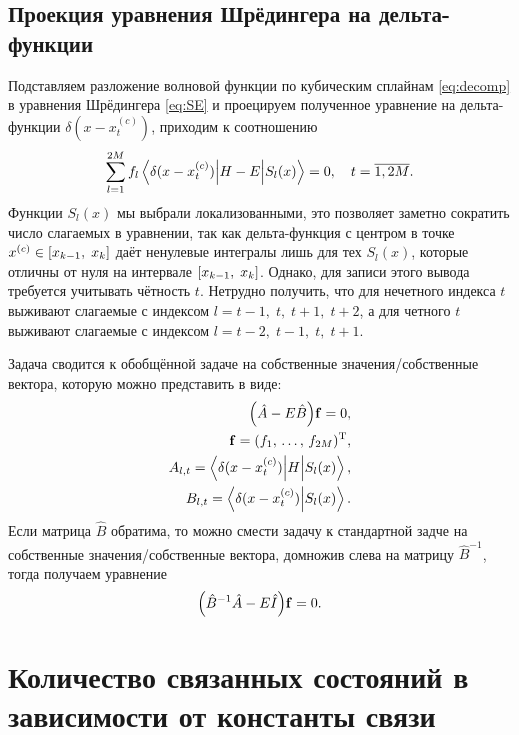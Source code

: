 \documentclass[10pt]{article}
\begin{document}
\subsection{Проекция уравнения Шрёдингера на дельта-функции}

Подставляем разложение волновой функции по кубическим сплайнам \eqref{eq:decomp} в уравнения Шрёдингера \eqref{eq:SE} и проецируем полученное уравнение на дельта-функции $\delta(x-x^{(c)}_t)$, приходим к соотношению
\begin{equation}
    \sum\limits_{l=1}^{2M} f_{l}
    \mel**{\delta(x-x^{(c)}_t)}{H-E}{S_{l}(x)}=0,\quad t=\overline{1,2M}.
\end{equation}
Функции $S_l(x)$ мы выбрали локализованными, это позволяет заметно сократить число слагаемых в уравнении, так как дельта-функция с центром в точке $x^{(c)}\in\qty[x_{k-1},\;x_{k}]$ даёт ненулевые интегралы лишь для тех $S_l(x)$, которые отличны от нуля на интервале $\qty[x_{k-1},\;x_{k}]$. Однако, для записи этого вывода требуется учитывать чётность $t$. Нетрудно получить, что для нечетного индекса $t$ выживают слагаемые с индексом $l=t-1,\;t,\;t+1,\;t+2$, а для четного $t$ выживают слагаемые с индексом $l=t-2,\;t-1,\;t,\;t+1$.

Задача сводится к обобщённой задаче на собственные значения/собственные вектора, которую можно представить в виде:
\begin{equation}
 \begin{split}
  \qty(\hat A - E \hat B) \vb{f} = 0,\\
  \vb{f} = (f_1,\, \ldots,\, f_{2M})^\textrm{T},\\
  A_{l,t} = \mel**{\delta(x-x^{(c)}_t)}{H}{S_{l}(x)},\\
  B_{l,t} = \braket{\delta(x-x^{(c)}_t)}{S_{l}(x)}.
 \end{split}
\end{equation}
Если матрица $\hat B$ обратима, то можно смести задачу к стандартной задче на собственные значения/собственные вектора, домножив слева на матрицу  $\hat B^{-1}$, тогда получаем уравнение
\begin{equation}
 \qty(\hat B^{-1} \hat A - E \hat I) \vb{f} = 0.
\end{equation}

\section{Количество связанных состояний в зависимости от константы связи}
\end{document}
